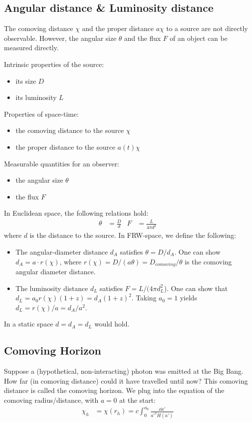 \subsection{Angular distance \& Luminosity distance}

The comoving distance $\chi$ and the proper distance $a \chi$ to a source are not directly observable. However, the angular size $\theta$ and the flux $F$ of an object can be measured directly.

Intrinsic properties of the source:
\begin{itemize}
	\item its size $D$
	\item its luminosity $L$
\end{itemize}
Properties of space-time:
\begin{itemize}
	\item the comoving distance to the source $\chi$
	\item the proper distance to the source $a(t) \chi$
\end{itemize}
Measurable quantities for an observer:
\begin{itemize}
	\item the angular size $\theta$
	\item the flux $F$
\end{itemize}
In Euclidean space, the following relations hold:
\begin{align*}
	\theta &= \frac{D}{d}
	& F &= \frac{L}{4 \pi d^2}
\end{align*}
where $d$ is the distance to the source. In FRW-space, we define the following:
\begin{itemize}
	\item The angular-diameter distance $d_A$ satisfies $\theta = D/d_A$. One can show $d_A = a \cdot r(\chi)$, where $r(\chi) = D/(a \theta) = D_{comoving}/\theta$ is the comoving angular diameter distance.
	\item The luminosity distance $d_L$ satisfies $F = L/(4\pi d_L^2$). One can show that $d_L = a_0 r(\chi) (1+z) = d_A (1+z)^2$. Taking $a_0 = 1$ yields $d_L = r(\chi)/a = d_A/a^2$. 
\end{itemize}
In a static space $d = d_A = d_L$ would hold. 

\subsection{Comoving Horizon}
Suppose a (hypothetical, non-interacting) photon was emitted at the Big Bang. How far (in comoving distance) could it have travelled until now? This comoving distance is called the comoving horizon. We plug into the equation of the comoving radius/distance, with $a=0$ at the start:
\begin{align*}
	\chi_h
	&= \chi (r_h) = c \int_0^{a_0} \frac{\dd{a'}}{a'^2 H(a')}
\end{align*}

